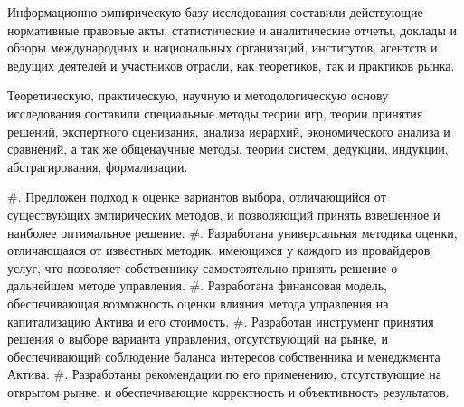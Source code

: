 Информационно-эмпирическую базу исследования составили действующие нормативные правовые акты, статистические и аналитические отчеты, доклады и обзоры международных и национальных организаций, институтов, агентств и ведущих деятелей и участников отрасли, как теоретиков, так и практиков рынка.

Теоретическую, практическую, научную и методологическую основу исследования составили специальные методы теории игр, теории принятия решений, экспертного оценивания, анализа иерархий, экономического анализа и сравнений, а так же общенаучные методы, теории систем, дедукции, индукции, абстрагирования, формализации.

#. Предложен подход к оценке вариантов выбора, отличающийся от существующих эмпирических методов, и позволяющий принять взвешенное и наиболее оптимальное решение.
#. Разработана универсальная методика оценки, отличающаяся от известных методик, имеющихся у каждого из провайдеров услуг, что позволяет собственнику самостоятельно принять решение о дальнейшем методе управления.
#. Разработана финансовая модель, обеспечивающая возможность оценки влияния метода управления на капитализацию Актива и его стоимость.
#. Разработан инструмент принятия решения о выборе варианта управления, отсутствующий на рынке, и обеспечивающий соблюдение баланса интересов собственника и менеджмента Актива.
#. Разработаны рекомендации по его применению, отсутствующие на открытом рынке, и обеспечивающие корректность и объективность результатов.
